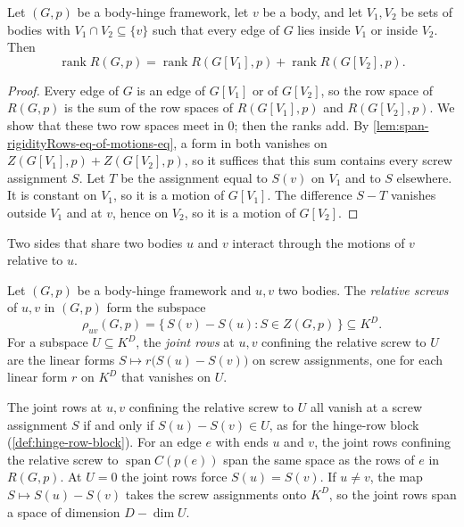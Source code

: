 \begin{lemma}
  \label{lem:block-rank-cut-vertex}
  \leanok
  Let $(G,p)$ be a body-hinge framework, let $v$ be a body, and let
  $V_1, V_2$ be sets of bodies with $V_1 \cap V_2 \subseteq \{v\}$ such
  that every edge of $G$ lies inside $V_1$ or inside $V_2$. Then
  \[
    \operatorname{rank} R(G,p)
    = \operatorname{rank} R(G[V_1],p) + \operatorname{rank} R(G[V_2],p).
  \]
\end{lemma}
\begin{proof}
  \leanok
  Every edge of $G$ is an edge of $G[V_1]$ or of $G[V_2]$, so the row
  space of $R(G,p)$ is the sum of the row spaces of $R(G[V_1],p)$ and
  $R(G[V_2],p)$. We show that these two row spaces meet in $0$; then
  the ranks add. By \cref{lem:span-rigidityRows-eq-of-motions-eq}, a
  form in both vanishes on $Z(G[V_1],p) + Z(G[V_2],p)$, so it suffices
  that this sum contains every screw assignment $S$. Let $T$ be the
  assignment equal to $S(v)$ on $V_1$ and to $S$ elsewhere. It is
  constant on $V_1$, so it is a motion of $G[V_1]$. The difference
  $S - T$ vanishes outside $V_1$ and at $v$, hence on $V_2$, so it is a
  motion of $G[V_2]$.
\end{proof}

Two sides that share two bodies $u$ and $v$ interact through the
motions of $v$ relative to $u$.

\begin{definition}
  \label{def:relative-screws}
  \leanok
  Let $(G,p)$ be a body-hinge framework and $u, v$ two bodies. The
  \emph{relative screws} of $u, v$ in $(G,p)$ form the subspace
  \[
    \rho_{uv}(G,p) = \{\, S(v) - S(u) : S \in Z(G,p) \,\} \subseteq K^{D}.
  \]
  For a subspace $U \subseteq K^{D}$, the \emph{joint rows} at $u, v$
  confining the relative screw to $U$ are the linear forms
  $S \mapsto r\bigl(S(u) - S(v)\bigr)$ on screw assignments, one for each
  linear form $r$ on $K^D$ that vanishes on $U$.
\end{definition}

The joint rows at $u, v$ confining the relative screw to $U$ all vanish
at a screw assignment $S$ if and only if $S(u) - S(v) \in U$, as for the
hinge-row block (\cref{def:hinge-row-block}). For an edge $e$ with ends
$u$ and $v$, the joint rows confining the relative screw to
$\operatorname{span} C(p(e))$ span the same space as the rows of $e$ in
$R(G,p)$. At $U = 0$ the joint rows force $S(u) = S(v)$. If $u \neq v$,
the map $S \mapsto S(u) - S(v)$ takes the screw assignments onto $K^D$,
so the joint rows span a space of dimension $D - \dim U$.

